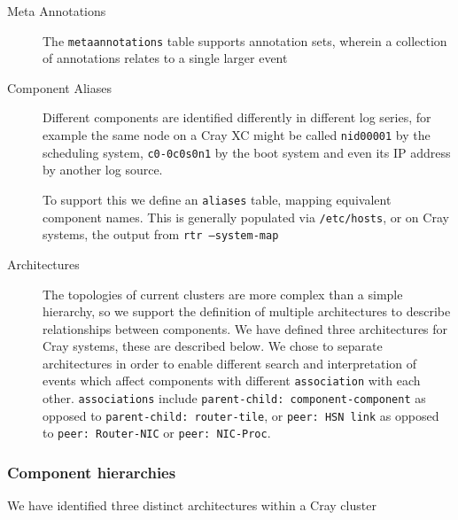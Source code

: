 \begin{description}
\item[Meta Annotations] \hfill

      The \texttt{metaannotations} table supports annotation sets,
      wherein a collection of annotations relates to a single larger
      event
      
\item[Component Aliases] \hfill

      Different components are identified differently in different log 
      series, for example the same node on a Cray XC might be called
      \texttt{nid00001} by the scheduling system, \texttt{c0-0c0s0n1}
      by the boot system and even its IP address by another log source.
      
      To support this we define an \texttt{aliases} table, mapping 
      equivalent component names. This is generally populated via
      \texttt{/etc/hosts}, or on Cray systems, the output from
      \texttt{rtr --system-map}
      
\item[Architectures] \hfill

      The topologies of current clusters are more complex than
      a simple hierarchy, so we support the definition of multiple
      architectures to describe relationships between components.
      We have defined three architectures for Cray systems, these
      are described below. 
      We chose to separate architectures in order to enable different
search and interpretation of events which affect components with
different \texttt{association} with each other. 
\texttt{associations}
include \texttt{parent-child: component-component} as opposed to
\texttt{parent-child: router-tile}, or \texttt{peer: HSN link}
as opposed to \texttt{peer: Router-NIC} or \texttt{peer: NIC-Proc}.

      
\end{description}

\subsubsection{Component hierarchies}
\label{s:hierarchies}

We have identified three distinct architectures within a Cray cluster

